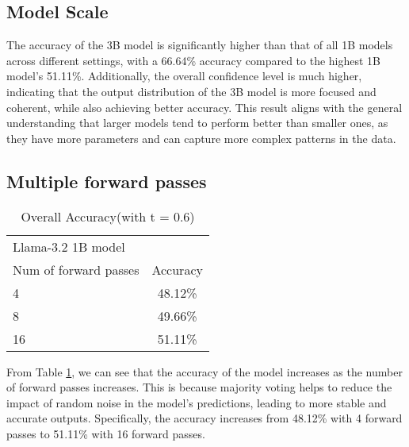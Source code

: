 \documentclass[
	a4paper, %
	10pt, %
	twoside, %
]{LTJournalArticle}
\begin{document}
\subsection{Model Scale}

The accuracy of the 3B model is significantly higher than that of all 1B models across different settings, with a 66.64\% accuracy compared to the highest 1B model's 51.11\%. Additionally, the overall confidence level is much higher, indicating that the output distribution of the 3B model is more focused and coherent, while also achieving better accuracy. This result aligns with the general understanding that larger models tend to perform better than smaller ones, as they have more parameters and can capture more complex patterns in the data.

\subsection{Multiple forward passes}

\begin{table} %
	\centering
	\begin{tabular}{l c}
		\toprule
		\multicolumn{2}{l}{Llama-3.2 1B model} \\
		\cmidrule(r){1-1}
		Num of forward passes  & Accuracy \\
		\midrule
		4 &  48.12\% \\
		8 &  49.66\% \\
		16 &  51.11\% \\
		\bottomrule
	\end{tabular}
	\caption{Overall Accuracy(with t = 0.6)}
	\label{tab:accuracy}
\end{table}

From Table \ref{tab:accuracy}, we can see that the accuracy of the model increases as the number of forward passes increases. This is because majority voting helps to reduce the impact of random noise in the model's predictions, leading to more stable and accurate outputs. Specifically, the accuracy increases from 48.12\% with 4 forward passes to 51.11\% with 16 forward passes.

\end{document}
